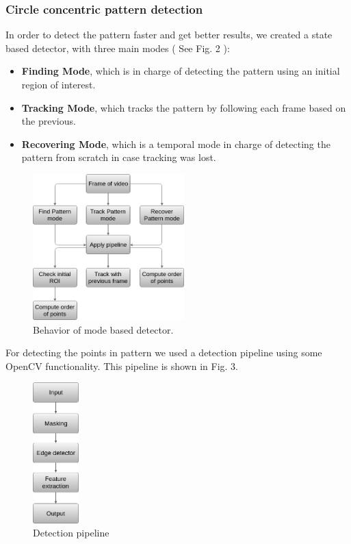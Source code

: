 \documentclass[journal]{IEEEtran}
\begin{document}
\subsubsection{ \textbf{Circle concentric pattern detection} }
In order to detect the pattern faster and get better results, we created a state based detector, with three main modes ( See Fig. 2 ):
\\
\begin{itemize}
  \item \textbf{Finding Mode}, which is in charge of detecting the pattern using an initial region of interest.
  \item \textbf{Tracking Mode}, which tracks the pattern by following each frame based on the previous.
  \item \textbf{Recovering Mode}, which is a temporal mode in charge of detecting the pattern from scratch in case tracking was lost.
\end{itemize}

\begin{figure}[H]
\centering
\includegraphics[width=2.3in]{_img/img_report4_pipeline_modes.png}
\caption{Behavior of mode based detector.}
\end{figure}

For detecting the points in pattern we used a detection pipeline using some OpenCV functionality. This pipeline is shown in Fig. 3.

\begin{figure}[H]
\centering
\includegraphics[width=0.7in]{_img/img_report4_pipeline_detector.png}
\caption{Detection pipeline}
\end{figure}
\end{document}
